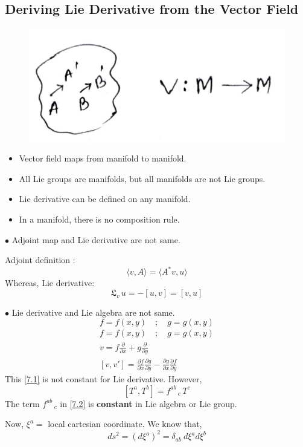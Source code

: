 \documentclass[14pt]{article} %
\begin{document}
\subsection*{Deriving Lie Derivative from the Vector Field}
\vspace{-0.7cm}
\begin{figure}[H]
\centering
\includegraphics[width=0.4\linewidth]{L4.jpeg}
\caption*{}
\end{figure}
\vspace{-1cm}
\begin{itemize}
\item Vector field maps from manifold to manifold.
\item All Lie groups are manifolds, but all manifolds are not Lie groups.
\item Lie derivative can be defined on any manifold.
\item In a manifold, there is no composition rule.
\end{itemize}
\begin{tcolorbox}[ title=Previous class discussion]
$\bullet$ Adjoint map and Lie derivative are not same.

Adjoint definition :
\[
\langle v,A \rangle = \langle A^*v , u \rangle
\]
Whereas, Lie derivative:
\[ \mathfrak{L}_v \, u = -[u,v] = [v,u] \]

$\bullet$ Lie derivative and Lie algebra are not same.
\[
f=f(x,y) \quad; \quad g=g(x,y)
\]
\begin{align*}
f=f(x,y) \quad; \quad g=g(x,y) \\
v = f \frac{\partial}{\partial x} + g \frac{\partial}{\partial y} \\
[v,v'] = \frac{\partial f}{\partial x}\frac{\partial g}{\partial y} - \frac{\partial g}{\partial x} \frac{\partial f}{\partial y} \tag{7.1} \label{7.1}
\end{align*}
This \eqref{7.1} is not constant for Lie derivative. However,
\[
[T^a , T^b] = f^{ab}\,_c \,T^c \tag{7.2} \label{7.2}
\]
The term $f^{ab}\,_c$ in \eqref{7.2} is \textbf{constant} in Lie algebra or Lie group.
\end{tcolorbox}
Now, $\xi^a =$ local cartesian coordinate. We know that,
\[
ds^2 = \left( d \xi^a \right)^2 = \delta_{ab}~d\xi^a d\xi^b \tag{7.3} \label{7.3}
\]
\end{document}
